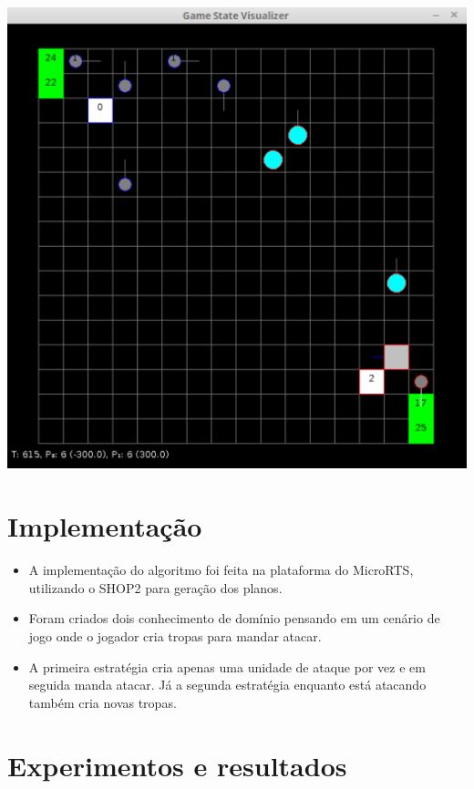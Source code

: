 \documentclass[a0,portrait]{a0poster}
\begin{document}
\begin{multicols}{2}
\vspace{10mm}

\begin{center}
	\includegraphics[width=0.5\linewidth]{fig/microRts.pdf}
\end{center}	


\color{NavyBlue}
\section*{\huge Implementa\c{c}\~ao}
\color{Black}

\begin{itemize}
	[leftmargin=2em]\itemadjust
	\item A implementa\c{c}\~ao do algoritmo foi feita na plataforma do MicroRTS, utilizando o SHOP2 para gera\c{c}\~ao dos planos.
	\item Foram criados dois conhecimento de dom\'inio pensando em um cen\'ario de jogo onde o jogador cria tropas para mandar atacar.
	\item A primeira estrat\'egia cria apenas uma unidade de ataque por vez e em seguida manda atacar. Já a segunda estrat\'egia enquanto está atacando também cria novas tropas.  
\end{itemize}


\color{NavyBlue}
\section*{\huge Experimentos e resultados}
\color{Black}


\end{multicols}
\end{document}
